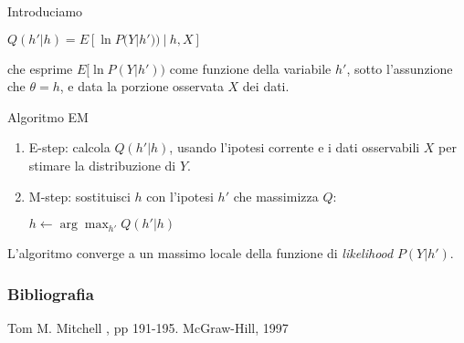 \documentclass[hyperref={pdfpagelabels=false},slidestop,mathserif,red]{beamer}
\begin{document}
\begin{frame}{}

\begin{block}{}
 Introduciamo
 \begin{center}
  $Q(h'|h) = E[\ln P(Y | h'))\ |\ h, X]$
 \end{center}
 che esprime $E[\ln P(Y | h'))$ come funzione della variabile $h'$, sotto l'assunzione che $\theta = h$, e data la porzione osservata $X$ dei dati.
\end{block}

\begin{block}{Algoritmo EM}
 \begin{enumerate}
  \item E-step: calcola $Q(h'|h)$, usando l'ipotesi corrente e i dati osservabili $X$ per stimare la distribuzione di $Y$.
  \item M-step: sostituisci $h$ con l'ipotesi $h'$ che massimizza $Q$:
	\begin{center}
	 $h \leftarrow \arg\max_{h'} Q(h'|h)$
	\end{center}
 \end{enumerate}

\end{block}

\begin{block}{}
 L'algoritmo converge a un massimo locale della funzione di \textit{likelihood} $P(Y|h')$.
\end{block}

\end{frame}


\begin{frame}
	\frametitle{Bibliografia}
	
		\begin{thebibliography}{}
			\footnotesize
				
			 Tom M. Mitchell
			, pp 191-195.
			\newblock McGraw-Hill, 1997
		\end{thebibliography}
\end{frame}
\end{document}

